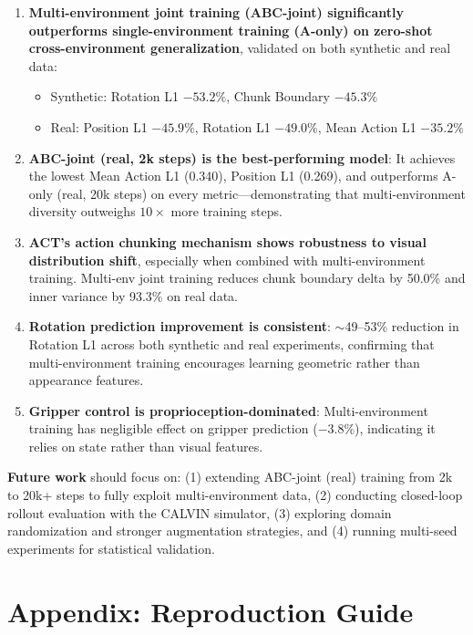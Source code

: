 \documentclass[10pt,twocolumn]{article}
\begin{document}
\begin{enumerate}[nosep]
    \item \textbf{Multi-environment joint training (ABC-joint) significantly outperforms single-environment training (A-only) on zero-shot cross-environment generalization}, validated on both synthetic and real data:
    \begin{itemize}[nosep]
        \item Synthetic: Rotation L1 $-53.2\%$, Chunk Boundary $-45.3\%$
        \item Real: Position L1 $-45.9\%$, Rotation L1 $-49.0\%$, Mean Action L1 $-35.2\%$
    \end{itemize}

    \item \textbf{ABC-joint (real, 2k steps) is the best-performing model}: It achieves the lowest Mean Action L1 (0.340), Position L1 (0.269), and outperforms A-only (real, 20k steps) on every metric---demonstrating that multi-environment diversity outweighs $10\times$ more training steps.

    \item \textbf{ACT's action chunking mechanism shows robustness to visual distribution shift}, especially when combined with multi-environment training. Multi-env joint training reduces chunk boundary delta by 50.0\% and inner variance by 93.3\% on real data.

    \item \textbf{Rotation prediction improvement is consistent}: $\sim$49--53\% reduction in Rotation L1 across both synthetic and real experiments, confirming that multi-environment training encourages learning geometric rather than appearance features.

    \item \textbf{Gripper control is proprioception-dominated}: Multi-environment training has negligible effect on gripper prediction ($-3.8\%$), indicating it relies on state rather than visual features.
\end{enumerate}

\textbf{Future work} should focus on: (1) extending ABC-joint (real) training from 2k to 20k+ steps to fully exploit multi-environment data, (2) conducting closed-loop rollout evaluation with the CALVIN simulator, (3) exploring domain randomization and stronger augmentation strategies, and (4) running multi-seed experiments for statistical validation.

\section*{Appendix: Reproduction Guide}
\end{document}
